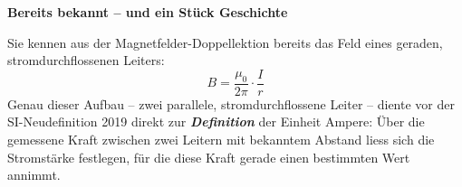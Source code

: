 \documentclass[addpoints,11pt,a4paper]{exam}
\newenvironment{beispielbox}[1][Beispiel]{%
  \par\addvspace{10pt}\noindent\textbf{#1}\par\smallskip\noindent
}{%
  \par\addvspace{10pt}
}
\begin{document}
\begin{beispielbox}[Bereits bekannt -- und ein Stück Geschichte]
Sie kennen aus der Magnetfelder-Doppellektion bereits das Feld eines
geraden, stromdurchflossenen Leiters:
\[
  B = \frac{\mu_0}{2\pi}\cdot\frac{I}{r}
\]
Genau dieser Aufbau -- zwei parallele, stromdurchflossene Leiter -- diente
vor der SI-Neudefinition 2019 direkt zur \textbf{\emph{Definition}} der
Einheit Ampere: Über die gemessene Kraft zwischen zwei Leitern mit
bekanntem Abstand liess sich die Stromstärke festlegen, für die diese Kraft
gerade einen bestimmten Wert annimmt.
\end{beispielbox}

\end{document}
